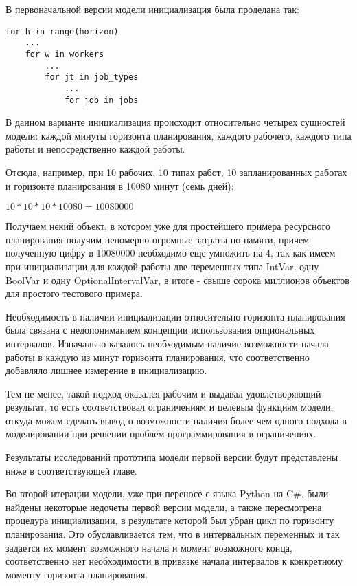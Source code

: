В первоначальной версии модели инициализация была проделана так:
\begin{verbatim}
for h in range(horizon)
    ...
    for w in workers
        ...
        for jt in job_types
            ...
            for job in jobs
\end{verbatim}

В данном варианте инициализация происходит относительно четырех сущностей модели: каждой минуты горизонта планирования, каждого рабочего, каждого типа работы и непосредственно каждой работы.

Отсюда, например, при 10 рабочих, 10 типах работ, 10 запланированных работах и горизонте планирования в 10080 минут (семь дней):

$10 * 10 * 10 * 10080 = 10080000$

Получаем некий объект, в котором уже для простейшего примера ресурсного планирования получим непомерно огромные затраты по памяти, причем полученную цифру в 10080000 необходимо еще умножить на 4, так как имеем при инициализации для каждой работы две переменных типа IntVar, одну BoolVar и одну OptionalIntervalVar, в итоге - свыше сорока миллионов объектов для простого тестового примера.

Необходимость в наличии инициализации относительно горизонта планирования была связана с недопониманием концепции использования опциональных интервалов. Изначально казалось необходимым наличие возможности начала работы в каждую из минут горизонта планирования, что соответственно добавляло лишнее измерение в инициализацию.

Тем не менее, такой подход оказался рабочим и выдавал удовлетворяющий результат, то есть соответствовал ограничениям и целевым функциям модели, откуда можем сделать вывод о возможности наличия более чем одного подхода в моделировании при решении проблем программирования в ограничениях.

Результаты исследований прототипа модели первой версии будут представлены ниже в соответствующей главе.

Во второй итерации модели, уже при переносе с языка Python на C\#, были найдены некоторые недочеты первой версии модели, а также пересмотрена процедура инициализации, в результате которой был убран цикл по горизонту планирования. Это обуславливается тем, что в интервальных переменных и так задается их момент возможного начала и момент возможного конца, соответственно нет необходимости в привязке начала интервалов к конкретному моменту горизонта планирования.

